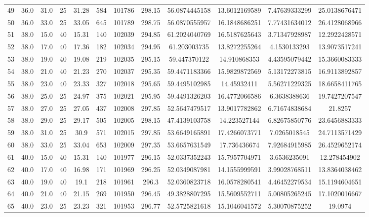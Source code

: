 \begin{table}[H]
\begin{center}
\begin{tabular}{|cccccccccccc|}
	49 & 36.0 & 31.0 & 25 & 31.28 & 584 & 101786 & 298.15 & 56.0874445158 & 13.6012169589 & 7.47639333299 & 25.0138676471\\
	50 & 36.0 & 33.0 & 25 & 33.05 & 645 & 101789 & 298.75 & 56.0870555957 & 16.1848686251 & 7.77431634012 & 26.4128068966\\
	51 & 38.0 & 15.0 & 40 & 15.31 & 140 & 102039 & 294.85 & 61.2024040769 & 16.5187625643 & 3.71347928987 & 12.2922428571\\
	52 & 38.0 & 17.0 & 40 & 17.36 & 182 & 102034 & 294.95 & 61.203003735 & 13.8272255264 & 4.1530133293 & 13.9073517241\\
	53 & 38.0 & 19.0 & 40 & 19.08 & 219 & 102035 & 295.15 & 59.447370122 & 14.910868353 & 4.43595079442 & 15.3660083333\\
	54 & 38.0 & 21.0 & 40 & 21.23 & 270 & 102037 & 295.35 & 59.4471183366 & 15.9829872569 & 5.13172273815 & 16.9113892857\\
	55 & 38.0 & 23.0 & 40 & 23.33 & 327 & 102018 & 295.65 & 59.4495102985 & 14.45932411 & 5.56271229325 & 18.6658411765\\
	56 & 38.0 & 25.0 & 25 & 24.97 & 375 & 102021 & 295.95 & 59.4491326203 & 16.4772066586 & 6.3638388636 & 19.7427207547\\
	57 & 38.0 & 27.0 & 25 & 27.05 & 437 & 102008 & 297.85 & 52.5647479517 & 13.9017782862 & 6.71674838684 & 21.8257\\
	58 & 38.0 & 29.0 & 25 & 29.17 & 505 & 102005 & 298.15 & 47.4139103758 & 14.223527144 & 6.82675850776 & 23.6456883333\\
	59 & 38.0 & 31.0 & 25 & 30.9 & 571 & 102015 & 297.85 & 53.6649165891 & 17.4266073771 & 7.0265018545 & 24.7113571429\\
	60 & 38.0 & 33.0 & 25 & 33.04 & 653 & 102009 & 297.35 & 53.6657631549 & 17.736436674 & 7.92684915985 & 26.4529652174\\
	61 & 40.0 & 15.0 & 40 & 15.31 & 140 & 101977 & 296.15 & 52.0337352243 & 15.7957704971 & 3.6536235091 & 12.278454902\\
	62 & 40.0 & 17.0 & 40 & 16.98 & 171 & 101969 & 296.25 & 52.0349087981 & 14.1555999591 & 3.99028768511 & 13.8364038462\\
	63 & 40.0 & 19.0 & 40 & 19.1 & 218 & 101961 & 296.3 & 52.0360823718 & 16.0578280541 & 4.46452279534 & 15.1194604651\\
	64 & 40.0 & 21.0 & 40 & 21.15 & 269 & 101950 & 296.45 & 49.3828807295 & 15.5609552711 & 5.00805265245 & 17.1020016667\\
	65 & 40.0 & 23.0 & 25 & 23.23 & 321 & 101953 & 296.77 & 52.5725821618 & 15.1046041572 & 5.30070875252 & 19.0974\\

\end{tabular}
\end{center}
\end{table}
